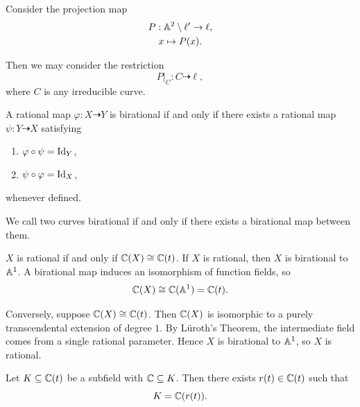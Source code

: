 Consider the projection map
\begin{gather*}
    P : \aa^2\setminus \ell' \to \ell,\\
    x \mapsto P(x).\\
\end{gather*}

Then we may consider the restriction
\[
    P|_C : C \dashrightarrow \ell,
\]
where $C$ is any irreducible curve.

\begin{definition}[Birational]
    A rational map $\varphi : X \dashrightarrow Y$ is birational if and only if there exists a rational map $\psi : Y \dashrightarrow X$ satisfying
    \begin{enumerate}[label={(\arabic*)}]
    \item $\varphi\circ\psi = \Id_Y$,
    \item $\psi\circ\varphi = \Id_X$,
    \end{enumerate}
    whenever defined.
\end{definition}

We call two curves birational if and only if there exists a birational map between them.

\begin{theorem}{
    $X$ is rational if and only if $\c(X)\cong \c(t)$.
}
If $X$ is rational, then $X$ is birational to $\aa^1$.
A birational map induces an isomorphism of function fields, so
\[
    \c(X)\cong \c(\aa^1)=\c(t).
\]

Conversely, suppose $\c(X)\cong \c(t)$.
Then $\c(X)$ is isomorphic to a purely transcendental extension of degree $1$.
By Lüroth's Theorem, the intermediate field comes from a single rational parameter.
Hence $X$ is birational to $\aa^1$, so $X$ is rational.
\end{theorem}

\begin{theorem*}{
    Let $K\subseteq \c(t)$ be a subfield with $\c\subseteq K$.
    Then there exists $r(t)\in\c(t)$ such that
    \[
        K = \c(r(t)).
    \]
}
\end{theorem*}